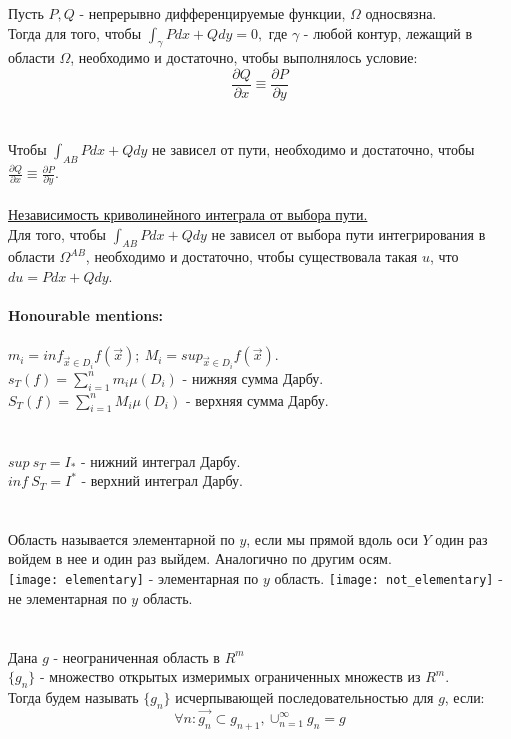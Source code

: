 \documentclass[12pt]{article}
\begin{document}
Пусть $P, Q$ - непрерывно дифференцируемые функции, $\Omega$ односвязна.\\
Тогда для того, чтобы $\int_\gamma Pdx+Qdy =0,$ где $\gamma$ - любой контур, лежащий в области $\Omega$, необходимо и достаточно, чтобы выполнялось условие:\\
$$\frac{\partial Q}{\partial x} \equiv \frac{\partial P}{\partial y}$$
\\
\\
Чтобы $\int_{AB} Pdx+Qdy$ не зависел от пути, необходимо и достаточно, чтобы $\frac{\partial Q}{\partial x} \equiv \frac{\partial P}{\partial y}$.\\
\\
\label{question29_3}\uline{Независимость криволинейного интеграла от выбора пути.}\\
Для того, чтобы $\int_{AB} Pdx + Qdy$ не зависел от выбора пути интегрирования в области $\Omega^{AB}$, необходимо и достаточно, чтобы существовала такая $u$, что $du = Pdx + Qdy$.\\
\\
\textbf{Honourable mentions:}\\ 
\label{darbouxSum}\\
$m_i = inf_{\overrightarrow{x} \in D_i} f(\overrightarrow{x}); \  M_i = sup_{\overrightarrow{x} \in D_i} f(\overrightarrow{x})$.\\
$s_T(f) = \sum_{i=1}^n m_i \mu(D_i)$ - нижняя сумма Дарбу.\\
$S_T(f) = \sum_{i=1}^n M_i \mu(D_i)$ - верхняя сумма Дарбу.\\
\\
\label{darbouxInt}\\
$sup \ s_T = I_{*}$ - нижний интеграл Дарбу.\\
$inf \ S_T = I^{*}$ - верхний интеграл Дарбу.\\
\\
\label{elementaryDomain}\\
Область называется элементарной по $y$, если мы прямой вдоль оси $Y$ один раз войдем в нее и один раз выйдем. Аналогично по другим осям.\\
\texttt{[image: elementary]} - элементарная по $y$ область. \texttt{[image: not\_elementary]} - не элементарная по $y$ область.\\
\\
\label{exhaustSeq}\\
Дана $g$ - неограниченная область в $R^m$\\
$\{ g_n \}$ - множество открытых измеримых ограниченных множеств из $R^m$.\\
Тогда будем называть $\{ g_n \}$ исчерпывающей последовательностью для $g$, если:\\
$$\forall n : \overrightarrow{g_n} \subset g_{n+1}, \cup_{n=1}^{\infty} g_n = g$$
\end{document}
